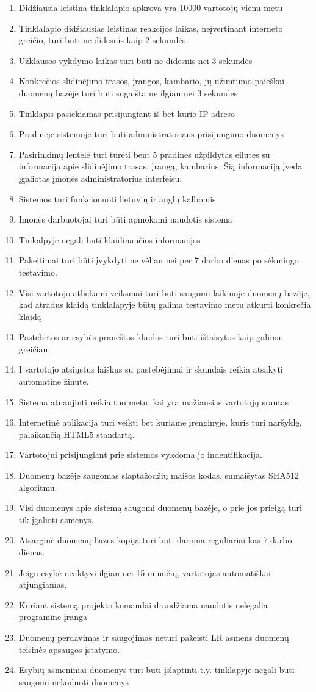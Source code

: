 \documentclass[oneside]{VUMIFPSkursinis}
\begin{document}
\begin{enumerate}
	\item Didžiausia leistina tinklalapio apkrova yra 10000 vartotojų vienu metu
	\item Tinklalapio didžiausias leistinas reakcijos laikas, neįvertinant interneto greičio, turi būti ne didesnis kaip 2 sekundės.
	\item Užklausos vykdymo laikas turi būti ne didesnis nei 3 sekundės
	\item Konkrečios slidinėjimo trasos, įrangos, kambario, jų užimtumo paieškai duomenų bazėje turi būti sugaišta ne ilgiau nei 3 sekundės
	\item Tinklapis pasiekiamas prisijungiant iš bet kurio IP adreso
	\item Pradinėje sistemoje turi būti administratoriaus prisijungimo duomenys
	\item Pasirinkimų lentelė turi turėti bent 5 pradines užpildytas eilutes su informacija apie slidinėjimo trasas, įrangą, kambarius. Šią informaciją įveda įgaliotas įmonės administratorius interfeisu.
	\item Sistemos turi funkcionuoti lietuvių ir anglų kalbomis
	\item Įmonės darbuotojai turi būti apmokomi naudotis sistema
	\item Tinkalpyje negali būti klaidinančios informacijos
	\item Pakeitimai turi būti įvykdyti ne vėliau nei per 7 darbo dienas po sėkmingo testavimo.
	\item Visi vartotojo atliekami veiksmai turi būti saugomi laikinoje duomenų bazėje, kad atradus klaidą tinklalapyje būtų galima testavimo metu atkurti konkrečia klaidą
	\item Pastebėtos ar esybės praneštos klaidos turi būti ištaisytos kaip galima greičiau.
	\item Į vartotojo atsiųstus laiškus su pastebėjimai ir skundais reikia atsakyti automatine žinute.
	\item Sistema atnaujinti reikia tuo metu, kai yra mažiausias vartotojų srautas
	\item Internetinė aplikacija turi veikti bet kuriame įrenginyje, kuris turi naršyklę, palaikančią HTML5 standartą.
	\item Vartotojui prisijungiant prie sistemos vykdoma jo indentifikacija.
	\item Duomenų bazėje saugomas slaptažodžių maišos kodas, sumaišytas SHA512 algoritmu.
	\item Visi duomenys apie sistemą saugomi duomenų bazėje, o prie jos prieigą turi tik įgalioti asmenys.
	\item Atsarginė duomenų bazės kopija turi būti daroma reguliariai kas 7 darbo dienas.
	\item Jeigu esybė neaktyvi ilgiau nei 15 minučių, vartotojas automatiškai atjungiamas.
	\item Kuriant sistemą projekto komandai draudžiama naudotis nelegalia programine įranga
	\item Duomenų perdavimas ir saugojimas neturi pažeisti LR asmens duomenų teisinės apsaugos įstatymo.
	\item Esybių asmeniniai duomenys turi būti įslaptinti t.y. tinklapyje negali būti saugomi nekoduoti duomenys


\end{enumerate}
\end{document}
